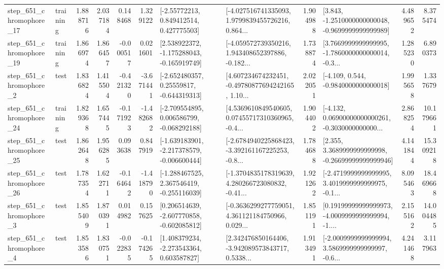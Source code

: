 \begin{tabular}{llrrrrllrlrr}
  step\_651\_chromophore\_17 &  training &      1.888716 &    2.037184 &      0.148468 &  1.329122 &     [-2.55772213, 0.849412514, 0.427775503] &  [-4.027516741335093, 1.9799839455726216, 0.864... &       1.904988 &  [3.843, -1.2510000000000048, -0.9699999999999989] &            4.489652 &          8.375474 \\
  step\_651\_chromophore\_19 &  training &      1.866974 &    1.866457 &     -0.000517 &  0.021601 &   [2.538922372, -1.175288043, -0.165919749] &  [-4.059572739350216, 1.943408652397886, -0.182... &       1.738874 &  [3.7669999999999995, -1.7860000000000014, -0.3... &            1.285230 &          6.890373 \\
   step\_651\_chromophore\_2 &      test &      1.836824 &    1.415504 &     -0.421320 & -3.671441 &    [-2.652480357, 0.25559817, -0.644319313] &  [4.607234674232451, -0.49780877694242165, 1.10... &       2.022051 &               [-4.109, 0.544, -0.9840000000000018] &            1.995658 &          1.337679 \\
  step\_651\_chromophore\_24 &  training &      1.829368 &    1.657445 &     -0.171923 & -1.482682 &   [-2.709554895, 0.006586799, -0.068292188] &  [4.5369610849540605, 0.07455717310360965, -0.4... &       1.904402 &  [-4.132, 0.06900000000000261, -0.3030000000000... &            2.868254 &         10.179661 \\
  step\_651\_chromophore\_25 &      test &      1.862648 &    1.956285 &      0.093638 &  0.847919 &  [-1.639183901, -2.217378579, -0.006600444] &  [-2.6784940225868423, -3.392161167225253, -0.8... &       1.784688 &  [2.355, 3.3689999999999998, -0.26699999999999946] &            4.141844 &         15.309218 \\
  step\_651\_chromophore\_26 &      test &      1.787354 &    1.622711 &     -0.164642 & -1.418790 &   [-1.288467525, 2.367546419, -0.255116039] &  [-1.3704835178319639, 4.280266723080832, -0.41... &       1.921262 &  [-2.4719999999999995, 3.4019999999999975, -0.1... &            8.095463 &         18.469668 \\
   step\_651\_chromophore\_3 &      test &      1.855409 &    1.870391 &      0.014982 &  0.157625 &   [0.206514639, -2.607770858, -0.602085812] &  [-0.3636299277759051, 4.361121184750966, 0.029... &       1.851191 &  [0.19199999999999973, -4.0009999999999994, -1.... &            2.155162 &         14.004485 \\
   step\_651\_chromophore\_4 &      test &      1.853586 &    1.830751 &     -0.022835 & -0.174265 &    [1.408379234, -2.273543364, 0.603587827] &  [2.342476850164406, -3.942089573843717, 0.5338... &       1.913491 &  [-2.0009999999999994, 3.5869999999999997, -0.6... &            4.241468 &          3.117963 \\

\end{tabular}
